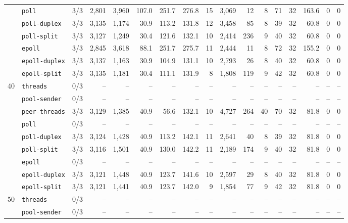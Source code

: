 \begin{longtable}{@{}llrrrrrrrrrrrrrrr@{}}
 & \texttt{poll} & 3/3 & 2{,}801 & 3{,}960 & 107.0 & 251.7 & 276.8 & 15 & 3{,}069 & 12 & 8 & 71 & 32 & 163.6 & 0 & 0 \\
 & \texttt{poll-duplex} & 3/3 & 3{,}135 & 1{,}174 & 30.9 & 113.2 & 131.8 & 12 & 3{,}458 & 85 & 8 & 39 & 32 & 60.8 & 0 & 0 \\
 & \texttt{poll-split} & 3/3 & 3{,}127 & 1{,}249 & 30.4 & 121.6 & 132.1 & 10 & 2{,}414 & 236 & 9 & 40 & 32 & 60.8 & 0 & 0 \\
 & \texttt{epoll} & 3/3 & 2{,}845 & 3{,}618 & 88.1 & 251.7 & 275.7 & 11 & 2{,}444 & 11 & 8 & 72 & 32 & 155.2 & 0 & 0 \\
 & \texttt{epoll-duplex} & 3/3 & 3{,}137 & 1{,}163 & 30.9 & 104.9 & 131.1 & 10 & 2{,}793 & 26 & 8 & 40 & 32 & 60.8 & 0 & 0 \\
 & \texttt{epoll-split} & 3/3 & 3{,}135 & 1{,}181 & 30.4 & 111.1 & 131.9 & 8 & 1{,}808 & 119 & 9 & 42 & 32 & 60.8 & 0 & 0 \\
\midrule
40 & \texttt{threads} & 0/3 & -- & -- & -- & -- & -- & -- & -- & -- & -- & -- & -- & -- & -- & -- \\
 & \texttt{pool-sender} & 0/3 & -- & -- & -- & -- & -- & -- & -- & -- & -- & -- & -- & -- & -- & -- \\
 & \texttt{peer-threads} & 3/3 & 3{,}129 & 1{,}385 & 40.9 & 56.6 & 132.1 & 10 & 4{,}727 & 264 & 40 & 70 & 32 & 81.8 & 0 & 0 \\
 & \texttt{poll} & 0/3 & -- & -- & -- & -- & -- & -- & -- & -- & -- & -- & -- & -- & -- & -- \\
 & \texttt{poll-duplex} & 3/3 & 3{,}124 & 1{,}428 & 40.9 & 113.2 & 142.1 & 11 & 2{,}641 & 40 & 8 & 39 & 32 & 81.8 & 0 & 0 \\
 & \texttt{poll-split} & 3/3 & 3{,}116 & 1{,}501 & 40.9 & 130.0 & 142.2 & 11 & 2{,}189 & 174 & 9 & 40 & 32 & 81.8 & 0 & 0 \\
 & \texttt{epoll} & 0/3 & -- & -- & -- & -- & -- & -- & -- & -- & -- & -- & -- & -- & -- & -- \\
 & \texttt{epoll-duplex} & 3/3 & 3{,}121 & 1{,}448 & 40.9 & 123.7 & 141.6 & 10 & 2{,}597 & 29 & 8 & 40 & 32 & 81.8 & 0 & 0 \\
 & \texttt{epoll-split} & 3/3 & 3{,}121 & 1{,}441 & 40.9 & 123.7 & 142.0 & 9 & 1{,}854 & 77 & 9 & 42 & 32 & 81.8 & 0 & 0 \\
\midrule
50 & \texttt{threads} & 0/3 & -- & -- & -- & -- & -- & -- & -- & -- & -- & -- & -- & -- & -- & -- \\
 & \texttt{pool-sender} & 0/3 & -- & -- & -- & -- & -- & -- & -- & -- & -- & -- & -- & -- & -- & -- \\

\end{longtable}
